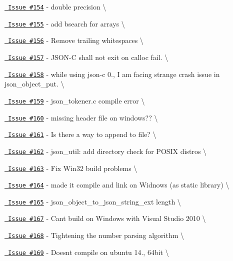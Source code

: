 \begin{DoxyItemize}
\item \href{https://github.com/json-c/json-c/issues/154}{\texttt{ Issue \#154}} -\/ double precision \textbackslash{}
\item \href{https://github.com/json-c/json-c/issues/155}{\texttt{ Issue \#155}} -\/ add bsearch for arrays \textbackslash{}
\item \href{https://github.com/json-c/json-c/issues/156}{\texttt{ Issue \#156}} -\/ Remove trailing whitespaces \textbackslash{}
\item \href{https://github.com/json-c/json-c/issues/157}{\texttt{ Issue \#157}} -\/ JSON-\/C shall not exit on calloc fail. \textbackslash{}
\item \href{https://github.com/json-c/json-c/issues/158}{\texttt{ Issue \#158}} -\/ while using json-\/c 0., I am facing strange crash issue in json\+\_\+object\+\_\+put. \textbackslash{}
\item \href{https://github.com/json-c/json-c/issues/159}{\texttt{ Issue \#159}} -\/ json\+\_\+tokener.\+c compile error \textbackslash{}
\item \href{https://github.com/json-c/json-c/issues/160}{\texttt{ Issue \#160}} -\/ missing header file on windows?? \textbackslash{}
\item \href{https://github.com/json-c/json-c/issues/161}{\texttt{ Issue \#161}} -\/ Is there a way to append to file? \textbackslash{}
\item \href{https://github.com/json-c/json-c/issues/162}{\texttt{ Issue \#162}} -\/ json\+\_\+util\+: add directory check for POSIX distros \textbackslash{}
\item \href{https://github.com/json-c/json-c/issues/163}{\texttt{ Issue \#163}} -\/ Fix Win32 build problems \textbackslash{}
\item \href{https://github.com/json-c/json-c/issues/164}{\texttt{ Issue \#164}} -\/ made it compile and link on Widnows (as static library) \textbackslash{}
\item \href{https://github.com/json-c/json-c/issues/165}{\texttt{ Issue \#165}} -\/ json\+\_\+object\+\_\+to\+\_\+json\+\_\+string\+\_\+ext length \textbackslash{}
\item \href{https://github.com/json-c/json-c/issues/167}{\texttt{ Issue \#167}} -\/ Can\textquotesingle{}t build on Windows with Visual Studio 2010 \textbackslash{}
\item \href{https://github.com/json-c/json-c/issues/168}{\texttt{ Issue \#168}} -\/ Tightening the number parsing algorithm \textbackslash{}
\item \href{https://github.com/json-c/json-c/issues/169}{\texttt{ Issue \#169}} -\/ Doesn\textquotesingle{}t compile on ubuntu 14., 64bit \textbackslash{}

\end{DoxyItemize}

